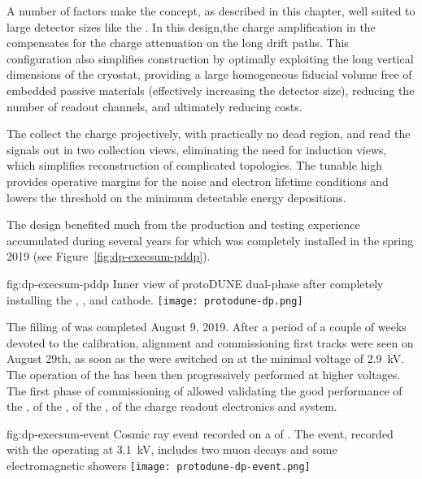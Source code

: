 A number of factors make the   concept, as described in this chapter, well suited to large detector sizes like the .
In this design,the charge amplification in the  compensates for the charge attenuation on the long drift paths.  This configuration also simplifies
construction by optimally exploiting the long vertical dimensions of the cryostat, providing a large homogeneous fiducial volume  free of embedded passive materials (effectively increasing the detector size), reducing the number of readout channels,  and ultimately reducing costs.  

The  collect the charge projectively,  with practically no dead region, and read the signals out  in two collection views, eliminating the need for  induction views,  which  simplifies reconstruction of complicated topologies. The tunable high  provides operative margins for the noise and electron lifetime conditions and lowers the threshold on the minimum detectable energy depositions.

The  design benefited much from the production and testing experience accumulated during several years for  which was completely installed in the spring 2019
(see Figure~\ref{fig:dp-execsum-pddp}). 

\begin{dunefigure}{fig:dp-execsum-pddp}
  {Inner view of protoDUNE dual-phase after completely installing the , , and cathode.}
  \texttt{[image: protodune-dp.png]}
\end{dunefigure}

The filling of  was completed August 9, 2019. After a period of a couple of weeks devoted to the  calibration, alignment and commissioning first tracks were seen on August 29th, as soon as the  were switched on at the minimal voltage of \SI{2.9}{kV}. The operation of the  has been then progressively performed at higher voltages. The first phase of commissioning of  allowed validating the good performance of the , of the , of the , of the charge readout electronics and  system.

\begin{dunefigure}{fig:dp-execsum-event}
  {Cosmic ray event recorded on a  of . The event, recorded with the  operating at \SI{3.1}{kV}, includes two muon decays and some electromagnetic showers }
  \texttt{[image: protodune-dp-event.png]}
\end{dunefigure}

